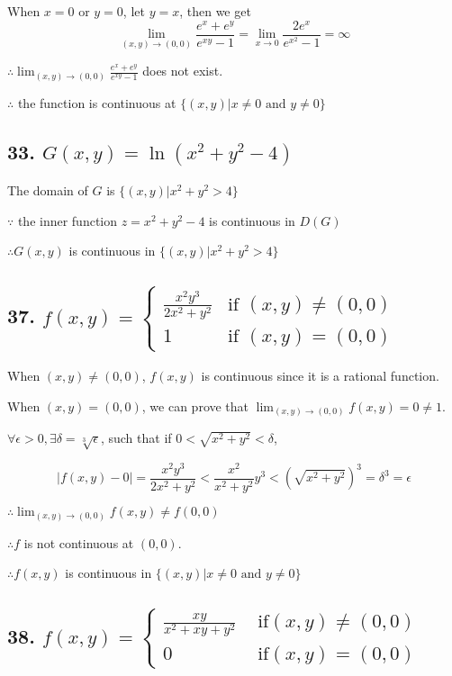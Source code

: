 \documentclass{article}
\begin{document}
    When $x = 0 \textrm{ or } y = 0$, let $y = x$, then we get $$\lim_{(x, y) \to (0, 0)}\frac{e^x + e^y}{e^{xy} - 1} = \lim_{x \to 0}\frac{2e^x}{e^{x^2} - 1} = \infty$$

    $\therefore \lim_{(x, y) \to (0, 0)}\frac{e^x + e^y}{e^{xy} - 1}$ does not exist.

    $\therefore$ the function is continuous at $\{ (x, y) | x \not = 0 \textrm{ and } y \not = 0 \}$

    \subsection*{33. $G(x, y) = \ln (x^2 + y^2 - 4)$}

    The domain of $G$ is $\{ (x, y) | x^2 + y^2 > 4\}$

    $\because$ the inner function $z = x^2 + y^2 - 4$ is continuous in $D(G)$

    $\therefore G(x, y)$ is continuous in $\{ (x, y) | x^2 + y^2 > 4\}$

    \subsection*{37. $f(x, y) = \left\{ \begin{array}{ll} \frac{x^2y^3}{2x^2 + y^2} &\textrm{if } (x, y) \not = (0, 0) \\ 1 &\textrm{if } (x, y) = (0, 0) \end{array}\right.$}

    When $(x, y) \not = (0, 0)$, $f(x, y)$ is continuous since it is a rational function.

    When $(x, y) = (0, 0)$, we can prove that $\lim_{(x, y) \to (0, 0)} f(x, y) = 0 \not = 1$.

    $\forall \epsilon > 0, \exists \delta = \sqrt[3]{\epsilon}$, such that if $0 < \sqrt{x^2 + y^2} < \delta$,
    
    $$|f(x, y) - 0| = \frac{x^2y^3}{2x^2 + y^2} < \frac{x^2}{x^2 + y^2} y^3 < (\sqrt{x^2 + y^2})^3 = \delta^3 = \epsilon$$

    $\therefore \lim_{(x, y) \to (0, 0)} f(x, y) \not = f(0, 0)$
    
    $\therefore f$ is not continuous at $(0, 0)$.

    $\therefore f(x, y)$ is continuous in $\{  (x, y) | x \not = 0 \textrm{ and } y \not = 0 \}$

    \subsection*{38. $f(x, y) = \left\{ \begin{array}{ll} \frac{xy}{x^2 + xy + y^2} &\textrm{ if} (x, y) \not = (0, 0) \\ 0 &\textrm{ if} (x, y) = (0, 0)\end{array}\right.$}
\end{document}
